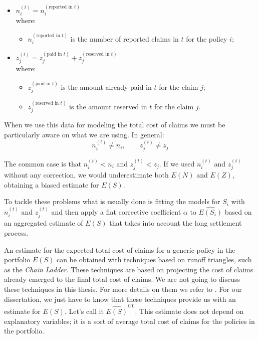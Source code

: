 \documentclass[a4paper, twoside, openright, 12pt]{report}
\providecommand{\tightlist}{%
  \setlength{\itemsep}{0pt}\setlength{\parskip}{0pt}}
\theoremstyle{definition}
\theoremstyle{definition}
\theoremstyle{definition}
\theoremstyle{remark}
\begin{document}
\begin{itemize}
\tightlist
\item
  \(n_i^{(t)} = n_i^{(\text{reported in } t)}\)\\
  where:

  \begin{itemize}
  \tightlist
  \item
    \(n_i^{(\text{reported in } t)}\) is the number of reported claims in \(t\) for the policy \(i\);
  \end{itemize}
\item
  \(z_j^{(t)} = z_j^{(\text{paid in }t)} + z_j^{(\text{reserved in } t)}\)\\
  where:

  \begin{itemize}
  \tightlist
  \item
    \(z_j^{(\text{paid in }t)}\) is the amount already paid in \(t\) for the claim \(j\);
  \item
    \(z_j^{(\text{reserved in } t)}\) is the amount reserved in \(t\) for the claim \(j\).
  \end{itemize}
\end{itemize}

When we use this data for modeling the total cost of claims we must be particularly aware on what we are using. In general:
\[
n_i^{(t)} \ne n_i, \qquad z_j^{(t)} \ne z_j
\]

The common case is that \(n_i^{(t)} < n_i\) and \(z_j^{(t)} < z_j\). If we used \(n_i^{(t)}\) and \(z_j^{(t)}\) without any correction, we would underestimate both \(E(N)\) and \(E(Z)\), obtaining a biased estimate for \(E(S)\).

To tackle these problems what is usually done is fitting the models for \(S_i\) with \(n_i^{(t)}\) and \(z_j^{(t)}\) and then apply a flat corrective coefficient \(\alpha\) to \(\widehat{E(S_i)}\) based on an aggregated estimate of \(E(S)\) that takes into account the long settlement process.

An estimate for the expected total cost of claims for a generic policy in the portfolio \(E(S)\) can be obtained with techniques based on runoff triangles, such as the \emph{Chain Ladder}. These techniques are based on projecting the cost of claims already emerged to the final total cost of claims. We are not going to discuss these techniques in this thesis. For more details on them we refer to \autocite{wuthrich-non-life-insurance-math-stats}. For our dissertation, we just have to know that these techniques provide us with an estimate for \(E(S)\). Let's call it \(\widehat{E(S)}^{CL}\). This estimate does not depend on explanatory variables; it is a sort of average total cost of claims for the policies in the portfolio.
\end{document}
